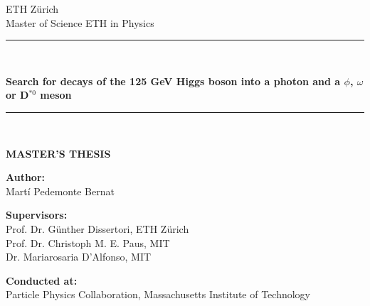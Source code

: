 \begin{titlepage}
\begin{center}

\vspace*{-2.0cm}

\begin{LARGE}
ETH Zürich\\[0.0cm]
Master of Science ETH in Physics\\
\end{LARGE}

\vspace*{0.9cm}

\rule{16cm}{0.1mm}\\
\begin{Huge}
\textbf{Search for decays of the 125 GeV Higgs boson into a photon and a $\phi$, $\omega$ or D$^{*0}$ meson} \\
\end{Huge}
\rule{16cm}{0.1mm}\\

\vspace*{1.3cm}

\textbf{\LARGE MASTER'S THESIS}\\

\vspace*{3.3cm}

\begin{Large}
\textbf{Author:}\\[0.0cm]
Martí Pedemonte Bernat\\[0.0cm]
\end{Large}

\vspace*{1.0cm}

\begin{Large}
\textbf{Supervisors:}\\[0.0cm]
Prof. Dr. Günther Dissertori, ETH Zürich\\[0.0cm]
Prof. Dr. Christoph M. E. Paus, MIT\\[0.0cm]
Dr. Mariarosaria D'Alfonso, MIT\\[0.0cm]
\end{Large}

\vspace*{1.0cm}

\begin{Large}
\textbf{Conducted at:}\\[0.0cm]
Particle Physics Collaboration, Massachusetts Institute of Technology\\[0.0cm]
\end{Large}


\end{center}
\end{titlepage}
